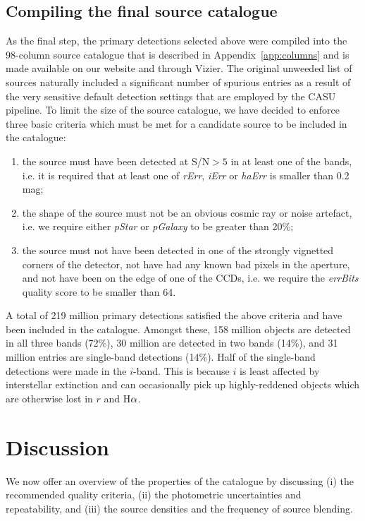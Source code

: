 \documentclass[useAMS,usenatbib]{mn2e}
\def\ha{\mbox{H$\rm \alpha$}}
\begin{document}
\subsection{Compiling the final source catalogue}

As the final step, the primary detections
selected above were compiled
into the 98-column source catalogue
that is described in Appendix~\ref{app:columns}
and is made available on our website and through Vizier.
The original unweeded list of sources naturally included 
a significant number of spurious entries
as a result of the very sensitive default detection settings
that are employed by the CASU pipeline.
To limit the size of the source catalogue,
we have decided to enforce three basic criteria
which must be met for a candidate source
to be included in the catalogue:
\begin{enumerate}
\item the source must have been detected at S/N$>5$ in at least
one of the bands, i.e. it is required that at least one of
\emph{rErr}, \emph{iErr} or \emph{haErr} is smaller
than 0.2 mag;
\item the shape of the source must not be an obvious
cosmic ray or noise artefact, i.e. we require
either \emph{pStar} or \emph{pGalaxy} to be
greater than 20\%;
\item the source must not have been detected in one of the strongly
vignetted corners of the detector, 
not have had any known bad pixels in the aperture,
and not have been on the edge of one of the CCDs,
i.e. we require the \emph{errBits} quality score
to be smaller than 64.
\end{enumerate}

A total of 219 million primary detections satisfied
the above criteria and have been included in the catalogue.
Amongst these, 158 million objects 
are detected in all three bands (72\%),
30 million are detected in two bands (14\%),
and 31 million entries are single-band detections (14\%).
Half of the single-band detections were made in the $i$-band.
This is because $i$ is least
affected by interstellar extinction and can occasionally pick up
highly-reddened objects which are otherwise lost in $r$ and \ha.

\section{Discussion}
\label{sec:discussion}

We now offer an overview of the properties of the
catalogue by discussing  
(i) the recommended quality criteria,
(ii) the photometric uncertainties and repeatability,
and (iii) the source densities and the frequency of source blending.
\end{document}
